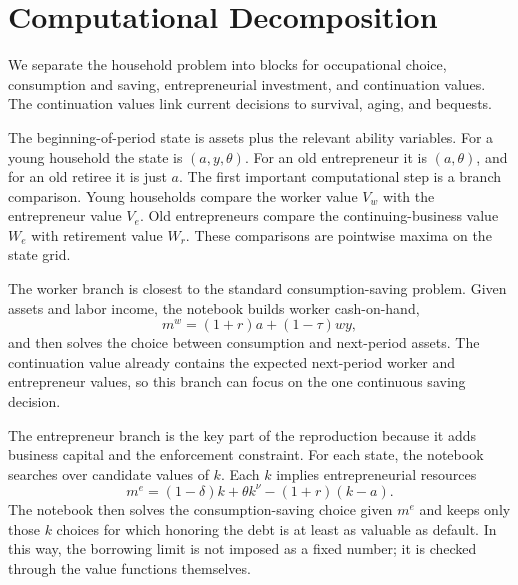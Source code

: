 \documentclass[\latexroot/\projectname]{subfiles}
\begin{document}
\section{Computational Decomposition}
\whenintegrated{\label{sec:decomposition}}

We separate the household problem into blocks for occupational choice, consumption and saving, entrepreneurial investment, and continuation values. The continuation values link current decisions to survival, aging, and bequests.

The beginning-of-period state is assets plus the relevant ability variables. For a young household the state is $(a,y,\theta)$. For an old entrepreneur it is $(a,\theta)$, and for an old retiree it is just $a$. The first important computational step is a branch comparison. Young households compare the worker value $V_w$ with the entrepreneur value $V_e$. Old entrepreneurs compare the continuing-business value $W_e$ with retirement value $W_r$. These comparisons are pointwise maxima on the state grid.

The worker branch is closest to the standard consumption-saving problem. Given assets and labor income, the notebook builds worker cash-on-hand,
\[
  m^w=(1+r)a+(1-\tau)wy,
\]
and then solves the choice between consumption and next-period assets. The continuation value already contains the expected next-period worker and entrepreneur values, so this branch can focus on the one continuous saving decision.

The entrepreneur branch is the key part of the reproduction because it adds business capital and the enforcement constraint. For each state, the notebook searches over candidate values of $k$. Each $k$ implies entrepreneurial resources
\[
  m^e=(1-\delta)k+\theta k^\nu-(1+r)(k-a).
\]
The notebook then solves the consumption-saving choice given $m^e$ and keeps only those $k$ choices for which honoring the debt is at least as valuable as default. In this way, the borrowing limit is not imposed as a fixed number; it is checked through the value functions themselves.
\end{document}
